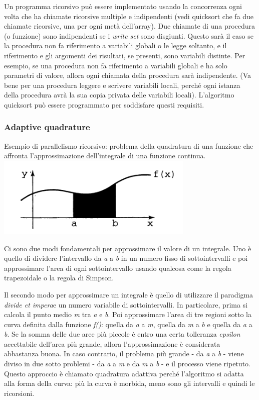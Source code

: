 \documentclass[10pt,a4paper]{book}
\begin{document}
Un programma ricorsivo può essere implementato usando la concorrenza ogni volta che ha chiamate ricorsive multiple e indipendenti (vedi quicksort che fa due chiamate ricorsive, una per ogni metà dell'array).
Due chiamate di una procedura (o funzione) sono indipendenti se i \textit{write set} sono disgiunti. Questo sarà il caso se la procedura non fa riferimento a variabili globali o le legge soltanto, e il riferimento e gli argomenti dei risultati, se presenti, sono variabili distinte. Per esempio, se una procedura non fa riferimento a variabili globali e ha solo parametri di valore, allora ogni chiamata della procedura sarà indipendente. (Va bene per una procedura leggere e scrivere variabili locali, perché ogni istanza della procedura avrà la sua copia privata delle variabili locali). L'algoritmo quicksort può essere programmato per soddisfare questi requisiti.

\subsubsection{Adaptive quadrature}
Esempio di parallelismo ricorsivo: problema della quadratura di una funzione che affronta l'approssimazione dell'integrale di una funzione continua.\\
\includegraphics[scale=0.4]{img/integral.png}

Ci sono due modi fondamentali per approssimare il valore di un integrale. Uno è quello di dividere l'intervallo da \textit{a} a \textit{b} in un numero fisso di sottointervalli e poi approssimare l'area di ogni sottointervallo usando qualcosa come la regola trapezoidale o la regola di Simpson.

Il secondo modo per approssimare un integrale è quello di utilizzare il paradigma \textit{divide et impera}e un numero variabile di sottointervalli. In particolare, prima si calcola il punto medio \textit{m} tra \textit{a} e \textit{b}. Poi approssimare l'area di tre regioni sotto la curva definita dalla funzione \textit{f()}: quella da \textit{a} a \textit{m}, quella da \textit{m} a \textit{b} e quella da \textit{a} a \textit{b}. Se la somma delle due aree più piccole è entro una certa  tolleranza \textit{epsilon} accettabile dell'area più grande, allora l'approssimazione è considerata abbastanza buona. In caso contrario, il problema più grande - da \textit{a} a\textit{ b} - viene diviso in due sotto problemi - da \textit{a} a \textit{m} e da \textit{m} a \textit{b} - e il processo viene ripetuto. Questo approccio è chiamato quadratura adattiva perché l'algoritmo si adatta alla forma della curva: più la curva è morbida, meno sono gli intervalli e quindi le ricorsioni.
\end{document}
